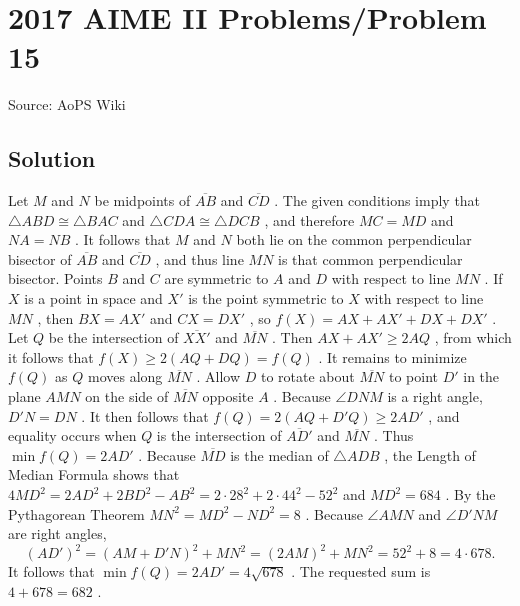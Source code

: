\documentclass[12pt]{article}
\begin{document}
\section*{{2017 AIME II Problems/Problem 15}}
Source: AoPS Wiki

\subsection*{Solution}
Let $M$ and $N$ be midpoints of $\overline{AB}$ and $\overline{CD}$ . The given conditions imply that $\triangle ABD\cong\triangle BAC$ and $\triangle CDA\cong\triangle DCB$ , and therefore $MC=MD$ and $NA=NB$ . It follows that $M$ and $N$ both lie on the common perpendicular bisector of $\overline{AB}$ and $\overline{CD}$ , and thus line $MN$ is that common perpendicular bisector. Points $B$ and $C$ are symmetric to $A$ and $D$ with respect to line $MN$ . If $X$ is a point in space and $X'$ is the point symmetric to $X$ with respect to line $MN$ , then $BX=AX'$ and $CX=DX'$ , so $f(X) = AX+AX'+DX+DX'$ . Let $Q$ be the intersection of $\overline{XX'}$ and $\overline{MN}$ . Then $AX+AX'\geq 2AQ$ , from which it follows that $f(X) \geq 2(AQ+DQ) = f(Q)$ . It remains to minimize $f(Q)$ as $Q$ moves along $\overline{MN}$ . Allow $D$ to rotate about $\overline{MN}$ to point $D'$ in the plane $AMN$ on the side of $\overline{MN}$ opposite $A$ . Because $\angle DNM$ is a right angle, $D'N=DN$ . It then follows that $f(Q) = 2(AQ+D'Q)\geq 2AD'$ , and equality occurs when $Q$ is the intersection of $\overline{AD'}$ and $\overline{MN}$ . Thus $\min f(Q) = 2AD'$ . Because $\overline{MD}$ is the median of $\triangle ADB$ , the Length of Median Formula shows that $4MD^2 = 2AD^2 + 2BD^2 - AB^2 = 2\cdot 28^2 + 2 \cdot 44^2 - 52^2$ and $MD^2 = 684$ . By the Pythagorean Theorem $MN^2 = MD^2 - ND^2 = 8$ . Because $\angle AMN$ and $\angle D'NM$ are right angles, \[(AD')^2 = (AM+D'N)^2 + MN^2 = (2AM)^2 + MN^2 = 52^2 + 8 = 4\cdot 678.\] It follows that $\min f(Q) = 2AD' = 4\sqrt{678}$ . The requested sum is $4+678=\boxed{682}$ .
\end{document}

